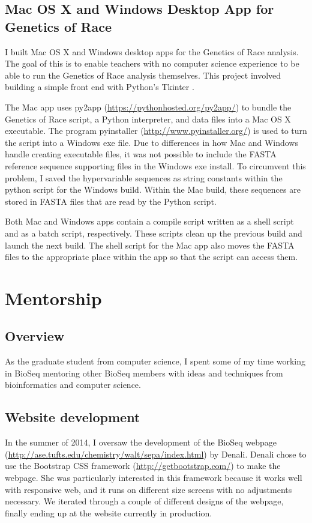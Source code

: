 \documentclass{report}
\begin{document}
\section{Mac OS X and Windows Desktop App for Genetics of Race}

I built Mac OS X and Windows desktop apps for the Genetics of Race analysis. The goal of this is to enable teachers with no computer science experience to be able to run the Genetics of Race analysis themselves. This project involved building a simple front end with Python's Tkinter \cite{shipman2005tkinter}. 

The Mac app uses py2app (\url{https://pythonhosted.org/py2app/}) to bundle the Genetics of Race script, a Python interpreter, and data files into a Mac OS X executable. The program pyinstaller (\url{http://www.pyinstaller.org/}) is used to turn the script into a Windows exe file. Due to differences in how Mac and Windows handle creating executable files, it was not possible to include the FASTA reference sequence supporting files in the Windows exe install. To circumvent this problem, I saved the hypervariable sequences as string constants within the python script for the Windows build. Within the Mac build, these sequences are stored in FASTA files that are read by the Python script. 

Both Mac and Windows apps contain a compile script written as a shell script and as a batch script, respectively. These scripts clean up the previous build and launch the next build. The shell script for the Mac app also moves the FASTA files to the appropriate place within the app so that the script can access them.


\chapter{Mentorship}
\section{Overview}
As the graduate student from computer science, I spent some of my time working in BioSeq mentoring other BioSeq members with ideas and techniques from  bioinformatics and computer science. 

\section{Website development}
In the summer of 2014, I oversaw the development of the BioSeq webpage (\url{http://ase.tufts.edu/chemistry/walt/sepa/index.html}) by Denali. Denali chose to use the Bootstrap CSS framework (\url{http://getbootstrap.com/}) to make the webpage. She was particularly interested in this framework because it works well with responsive web, and it runs on different size screens with no adjustments necessary. We iterated through a couple of different designs of the webpage, finally ending up at the website currently in production.
\end{document}
